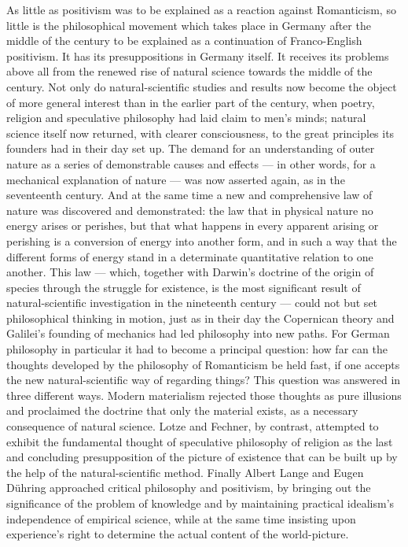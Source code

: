 \documentclass[12pt,a4paper]{book}
\newcommand{\opage}[1]{\marginnote{\footnotesize\textit{[#1]}}}
\begin{document}
As little as positivism was to be explained as a reaction against Romanticism,
so little is the philosophical movement which takes place in Germany after the
middle of the century to be explained as a continuation of Franco-English
positivism. It has its presuppositions in Germany itself. It receives its
problems above all from the renewed rise of natural science towards the middle
of the century. Not only do natural-scientific studies and results now become
the object of more general interest than in the earlier part of the century,
when poetry, religion and speculative philosophy had laid claim to men's minds;
\opage{494}natural science itself now returned, with clearer consciousness, to the great
principles its founders had in their day set up. The demand for an
understanding of outer nature as a series of demonstrable causes and effects ---
in other words, for a mechanical explanation of nature --- was now asserted
again, as in the seventeenth century. And at the same time a new and
comprehensive law of nature was discovered and demonstrated: the law that in
physical nature no energy arises or perishes, but that what happens in every
apparent arising or perishing is a conversion of energy into another form, and
in such a way that the different forms of energy stand in a determinate
quantitative relation to one another. This law --- which, together with Darwin's
doctrine of the origin of species through the struggle for existence, is the
most significant result of natural-scientific investigation in the nineteenth
century --- could not but set philosophical thinking in motion, just as in their
day the Copernican theory and Galilei's founding of mechanics had led philosophy
into new paths. For German philosophy in particular it had to become a principal
question: how far can the thoughts developed by the philosophy of Romanticism be
held fast, if one accepts the new natural-scientific way of regarding things?
This question was answered in three different ways. Modern materialism rejected
those thoughts as pure illusions and proclaimed the doctrine that only the
material exists, as a necessary consequence of natural science. Lotze and
Fechner, by contrast, attempted to exhibit the fundamental thought of speculative
philosophy of religion as the last and concluding presupposition of the picture
of existence that can be built up by the help of the natural-scientific method.
Finally Albert Lange and Eugen Dühring approached critical philosophy and
positivism, by bringing out the significance of the problem of knowledge and by
maintaining practical idealism's independence of empirical science, while at the
same time insisting upon experience's right to determine the actual content of
the world-picture.
\end{document}
